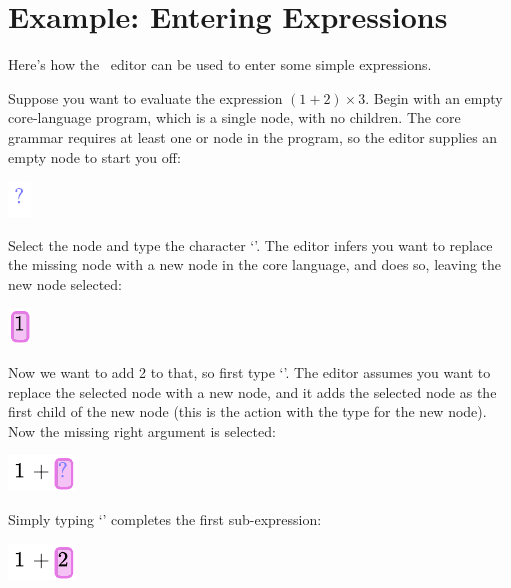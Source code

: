 

%
%
\section{Example: Entering Expressions}

Here's how the \Meta\ editor can be used to enter some simple expressions.

Suppose you want to evaluate the expression $(1+2) \times 3$. Begin with an empty core-language program, which is a single  node, with no children. The core grammar requires at least one  or  node in the program, so the editor supplies an empty node to start you off:
\begin{center}
\includegraphics{src/image/expr1.pdf}
\end{center}

Select the node and type the character `'. The editor infers you want to replace the missing node with a new  node in the core language, and does so, leaving the new node selected:
\begin{center}
\includegraphics{src/image/expr2.pdf}
\end{center}

Now we want to add 2 to that, so first type `\clojure{+}'. The editor assumes you want to replace the selected node with a new  node, and it adds the selected node as the first child of the new node (this is the  action with the type  for the new node). Now the missing right argument is selected:
\begin{center}
\includegraphics{src/image/expr3.pdf}
\end{center}

Simply typing `' completes the first sub-expression:
\begin{center}
\includegraphics{src/image/expr4.pdf}
\end{center}

